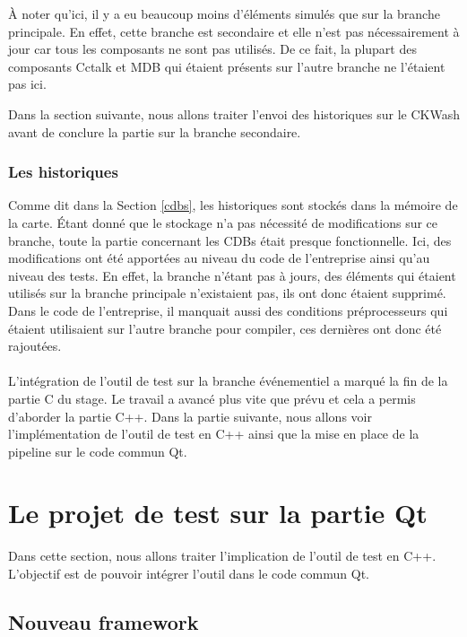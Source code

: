 \documentclass[a4paper]{article}
\begin{document}
À noter qu'ici, il y a eu beaucoup moins d'éléments simulés que sur la branche
principale. En effet, cette branche est secondaire et elle n'est pas
nécessairement à jour car tous les composants ne sont pas utilisés. De ce fait,
la plupart des composants Cctalk et MDB qui étaient présents sur l'autre branche
ne l'étaient pas ici.

Dans la section suivante, nous allons traiter l'envoi des historiques sur le
CKWash avant de conclure la partie sur la branche secondaire.

\subsubsection*{Les historiques}

Comme dit dans la Section \ref{cdbs}, les historiques sont stockés dans la
mémoire de la carte. Étant donné que le stockage n'a pas nécessité de
modifications sur ce branche, toute la partie concernant les CDBs était presque
fonctionnelle. Ici, des modifications ont été apportées au niveau du code de
l'entreprise ainsi qu'au niveau des tests. En effet, la branche n'étant pas à
jours, des éléments qui étaient utilisés sur la branche principale n'existaient
pas, ils ont donc étaient supprimé. Dans le code de l'entreprise, il manquait
aussi des conditions préprocesseurs qui étaient utilisaient sur l'autre branche
pour compiler, ces dernières ont donc été rajoutées.
\\~\\

L'intégration de l'outil de test sur la branche événementiel a marqué la fin de
la partie C du stage. Le travail a avancé plus vite que prévu et cela a permis
d'aborder la partie C++. Dans la partie suivante, nous allons voir
l'implémentation de l'outil de test en C++ ainsi que la mise en place de la
pipeline sur le code commun Qt.
\section{Le projet de test sur la partie Qt}%

Dans cette section, nous allons traiter l'implication de l'outil de test en
C++. L'objectif est de pouvoir intégrer l'outil dans le code commun Qt.

\subsection{Nouveau framework}
\label{nouvframe}
\end{document}
